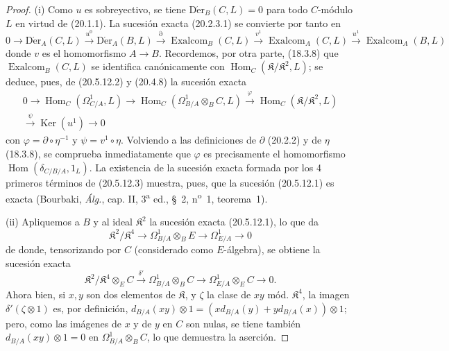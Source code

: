 \begin{proof}

(i) Como $u$ es sobreyectivo, se tiene $\operatorname{D\acute{e}r}_B(C,L)=0$ para todo $C$-módulo
$L$ en virtud de (20.1.1). La sucesión exacta (20.2.3.1) se convierte por tanto en
\begin{equation}
\tag{20.5.12.2}
\label{0.20.5.12.2-fr}
  0\longrightarrow\operatorname{D\acute{e}r}_A(C,L)\xrightarrow{u^0}\operatorname{D\acute{e}r}_A(B,L)
  \xrightarrow{\partial}\operatorname{Exalcom}_B(C,L)
  \xrightarrow{v^1}\operatorname{Exalcom}_A(C,L)
  \xrightarrow{u^1}\operatorname{Exalcom}_A(B,L)
\end{equation}
donde $v$ es el homomorfismo $A\to B$. Recordemos, por otra parte, (18.3.8) que
$\operatorname{Exalcom}_B(C,L)$ se identifica canónicamente con
$\operatorname{Hom}_C(\mathfrak{K}/\mathfrak{K}^2,L)$; se deduce, pues, de (20.5.12.2)
y (20.4.8) la sucesión exacta
\begin{equation}
\tag{20.5.12.3}
\label{0.20.5.12.3-fr}
\begin{split}
  0\longrightarrow\operatorname{Hom}_C(\Omega^1_{C/A},L)
  \longrightarrow\operatorname{Hom}_C(\Omega^1_{B/A}\otimes_B C,L)
  \xrightarrow{\varphi}\operatorname{Hom}_C(\mathfrak{K}/\mathfrak{K}^2,L)\\
  \xrightarrow{\psi}\operatorname{Ker}(u^1)\longrightarrow 0
\end{split}
\end{equation}
con $\varphi=\partial\circ\eta^{-1}$ y $\psi=v^1\circ\eta$. Volviendo
a las definiciones de $\partial$ (20.2.2) y de $\eta$ (18.3.8), se comprueba
inmediatamente que $\varphi$ es precisamente el homomorfismo
$\operatorname{Hom}(\delta_{C/B/A},1_L)$. La existencia de la sucesión exacta formada por los
4 primeros términos de (20.5.12.3) muestra, pues, que la sucesión (20.5.12.1)
es exacta (Bourbaki, \emph{Álg.}, cap. II, 3\textsuperscript{a} ed.,
\S~2, n\textsuperscript{o}~1, teorema~1).

\medskip
(ii) Apliquemos a $B$ y al ideal $\mathfrak{K}^2$ la sucesión exacta
(20.5.12.1), lo que da
\begin{equation}
\tag{20.5.12.4}
\label{0.20.5.12.4-fr}
  \mathfrak{K}^2/\mathfrak{K}^4\longrightarrow
  \Omega^1_{B/A}\otimes_B E\longrightarrow\Omega^1_{E/A}\longrightarrow 0
\end{equation}
de donde, tensorizando por $C$ (considerado como $E$-álgebra), se obtiene la sucesión
exacta
\[
  \mathfrak{K}^2/\mathfrak{K}^4\otimes_E C\xrightarrow{\delta'}
  \Omega^1_{B/A}\otimes_B C\longrightarrow
  \Omega^1_{E/A}\otimes_E C\longrightarrow 0.
\]
Ahora bien, si $x,y$ son dos elementos de $\mathfrak{K}$, y $\zeta$ la clase
de $xy$ mód. $\mathfrak{K}^4$, la imagen
$\delta'(\zeta\otimes1)$ es, por definición,
$d_{B/A}(xy)\otimes1=(xd_{B/A}(y)+yd_{B/A}(x))\otimes1$; pero, como las
imágenes de $x$ y de $y$ en $C$ son nulas, se tiene también
$d_{B/A}(xy)\otimes1=0$ en $\Omega^1_{B/A}\otimes_B C$, lo que demuestra
la aserción.


\end{proof}
